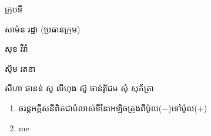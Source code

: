 \documentclass[15pt,a4paper]{article}
\author{james1}
\date{\today}
\newenvironment{kfont}{\khfont}{\par}
\begin{document}
\hfill\begin{minipage}{.5\linewidth}
\begin{kfont}ក្រុបទី\end{kfont} 2
\begin{kfont}សាម៉ន រដ្ឋា (ប្រធានក្រុម)\end{kfont}
\begin{kfont}សុខ វីវ៉ា\end{kfont}
\begin{kfont}សុីម រតនា\end{kfont}
សីហា ឆានន់ 
សូ លីហុង
 ស៊ូ ចាន់រ៉ូជែម
សុំ សុភ័ត្រា
\end{minipage}
\begin{enumerate}
\item 
\begin{kfont}
ចរន្តអគ្គីសនីពិតជាបំលាស់ទីនៃអេឡិចត្រុងពីប៉ូល(\(-\))ទៅប៉ូល(\(+\))
\end{kfont}
\item 
me
\end{enumerate}
\end{document}
